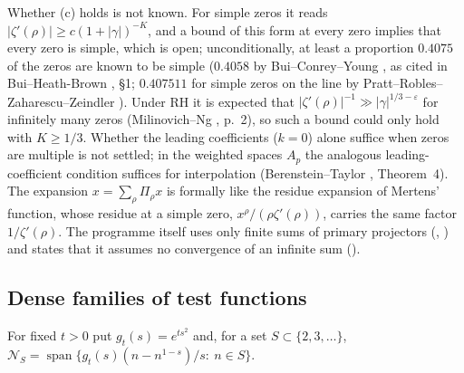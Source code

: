 \begin{remark}\label{rem:primary}
Whether (c) holds is not known. For simple zeros it reads $|\zeta'(\rho)|\ge c(1+|\gamma|)^{-K}$, and a bound of this form at every zero implies that every zero is simple, which is open; unconditionally, at least a proportion $0.4075$ of the zeros are known to be simple ($0.4058$ by Bui--Conrey--Young \cite{BCY}, as cited in Bui--Heath-Brown \cite{BuiHeathBrown}, §1; $0.407511$ for simple zeros on the line by Pratt--Robles--Zaharescu--Zeindler \cite{PRZZ}). Under RH it is expected that $|\zeta'(\rho)|^{-1}\gg|\gamma|^{1/3-\varepsilon}$ for infinitely many zeros (Milinovich--Ng \cite{MilinovichNg}, p.~2), so such a bound could only hold with $K\ge1/3$.
Whether the leading coefficients ($k=0$) alone suffice when zeros are multiple is not settled; in the weighted spaces $A_p$ the analogous leading-coefficient condition suffices for interpolation (Berenstein--Taylor \cite{BerensteinTaylor}, Theorem~4).
The expansion $x=\sum_\rho\Pi_\rho x$ is formally like the residue expansion of Mertens' function, whose residue at a simple zero, $x^\rho/(\rho\zeta'(\rho))$, carries the same factor $1/\zeta'(\rho)$.
The programme itself uses only finite sums of primary projectors (, ) and states that it assumes no convergence of an infinite sum ().
\end{remark}

\subsection{Dense families of test functions}

For fixed $t>0$ put $g_t(s)=e^{ts^2}$ and, for a set $S\subset\{2,3,\dots\}$, $\mathcal{N}_S=\operatorname{span}\{g_t(s)(n-n^{1-s})/s:\ n\in S\}$.

